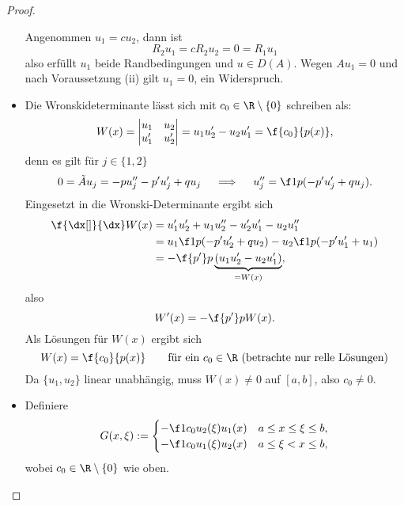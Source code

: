 \begin{st}
\begin{proof}
\begin{seg}[(ii)$\implies$(i)]
\begin{itemize}
					Angenommen $u_1 = c u_2$, dann ist
					\[
						R_2 u_1 = c R_2 u_2 = 0 = R_1u_1
					\]
					also erfüllt $u_1$ beide Randbedingungen und $u \in D(A)$.
					Wegen $Au_1 = 0$ und nach Voraussetzung (ii) gilt $u_1 = 0$, ein Widerspruch.
				\item
					Die Wronskideterminante lässt sich mit $c_0 \in \R \setminus \{0\}$ schreiben als:
					\[
						W(x) = \begin{vmatrix}
							u_1 & u_2 \\
							u_1' & u_2'
						\end{vmatrix}
						= u_1u_2' - u_2u_1' = \f {c_0}{p(x)},
					\]
					denn es gilt für $j\in \{1,2\}$
					\[
						0 = \tilde A u_j = -pu_j'' - p'u_j' + qu_j
						\quad\implies\quad
						u_j'' = \f 1{p}(-p'u_j' + qu_j).
					\]
					Eingesetzt in die Wronski-Determinante ergibt sich
					\begin{align*}
						\f {\dx[]}{\dx} W(x) 
						&= u_1'u_2' + u_1u_2'' - u_2'u_1' - u_2u_1'' \\
						&= u_1 \f 1p (-p'u_2' + qu_2) - u_2 \f 1p (-p'u_1' + u_1) \\
						&= -\f {p'}p \underbrace{(u_1u_2' - u_2u_1')}_{=W(x)},
					\end{align*}
					also
					\[
						W'(x) = - \f {p'}p W(x).
					\]
					Als Lösungen für $W(x)$ ergibt sich
					\[
						W(x) = \f {c_0}{p(x)} 
						\qquad \text{für ein $c_0\in \R$ (betrachte nur relle Lösungen)}
					\]
					Da $\{u_1,u_2\}$ linear unabhängig, muss $W(x) \neq 0$ auf $[a,b]$, also $c_0\neq 0$.
				\item
					Definiere
					\[
						G(x,\xi) := \begin{cases}
							-\f 1{c_0} u_2(\xi)u_1(x) & a \le x \le \xi \le b, \\
							-\f 1{c_0} u_1(\xi)u_2(x) & a \le \xi < x \le b,
						\end{cases}
					\]
					wobei $c_0 \in \R \setminus \{0\}$ wie oben.


\end{itemize}
\end{seg}
\end{proof}
\end{st}
